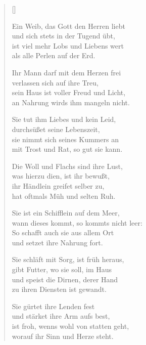 \begin{multicols}{2}
\settowidth{\versewidth}{Sie ist ein Schifflein auf dem Meer,}
\begin{verse}[\versewidth]

 Ein Weib, das Gott den Herren liebt\\
und sich stets in der Tugend übt,\\
ist viel mehr Lobs und Liebens wert\\
als alle Perlen auf der Erd.

 Ihr Mann darf mit dem Herzen frei\\
verlassen sich auf ihre Treu,\\
sein Haus ist voller Freud und Licht,\\
an Nahrung wirds ihm mangeln nicht.

 Sie tut ihm Liebes und kein Leid,\\
durchsüßet seine Lebenszeit,\\
sie nimmt sich seines Kummers an\\
mit Trost und Rat, so gut sie kann.

 Die Woll und Flachs sind ihre Lust,\\
was hierzu dien, ist ihr bewußt,\\
ihr Händlein greifet selber zu,\\
hat oftmals Müh und selten Ruh.

 Sie ist ein Schifflein auf dem Meer,\\
wann dieses kommt, so kommts nicht leer:\\
So schafft auch sie aus allem Ort\\
und setzet ihre Nahrung fort.

 Sie schläft mit Sorg, ist früh heraus,\\
gibt Futter, wo sie soll, im Haus\\
und speist die Dirnen, derer Hand\\
zu ihren Diensten ist gewandt.

 Sie gürtet ihre Lenden fest\\
und stärket ihre Arm aufs best,\\
ist froh, wenns wohl von statten geht,\\
worauf ihr Sinn und Herze steht.


\end{verse}
\end{multicols}
